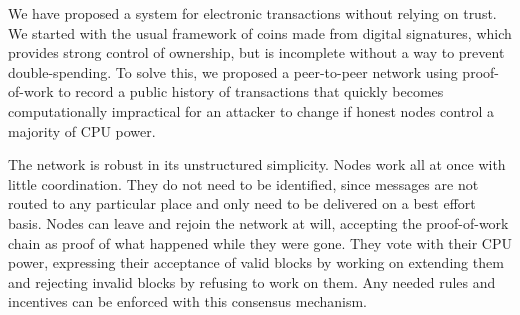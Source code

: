 We have proposed a system for electronic transactions without relying on trust. We started with the usual framework of coins made from digital signatures, which provides strong control of ownership, but is incomplete without a way to prevent double-spending. To solve this, we proposed a peer-to-peer network using proof-of-work to record a public history of transactions that quickly becomes computationally impractical for an attacker to change if honest nodes control a majority of CPU power.

The network is robust in its unstructured simplicity. Nodes work all at once with little coordination. They do not need to be identified, since messages are not routed to any particular place and only need to be delivered on a best effort basis. Nodes can leave and rejoin the network at will, accepting the proof-of-work chain as proof of what happened while they were gone. They vote with their CPU power, expressing their acceptance of valid blocks by working on extending them and rejecting invalid blocks by refusing to work on them. Any needed rules and incentives can be enforced with this consensus mechanism.

